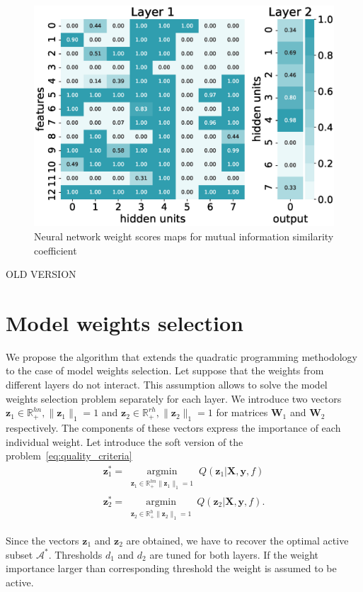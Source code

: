 \documentclass[a4paper,12pt]{article}
\theoremstyle{plain} %
\theoremstyle{definition} %
\theoremstyle{remark} %
\newcommand{\by}{\mathbf{y}}
\newcommand{\bz}{\mathbf{z}}
\newcommand{\cA}{\mathcal{A}}
\newcommand{\bbR}{\mathbb{R}}
\newcommand{\bW}{\mathbf{W}}
\newcommand{\bX}{\mathbf{X}}
\newcommand{\argmin}{\mathop{\arg \min}\limits}
\begin{document}
	\begin{figure}[!h]	
		\includegraphics[width=0.8\linewidth]{figs/qpfs_nn_weight_maps.eps}	 
	  	\caption{Neural network weight scores maps for mutual information similarity coefficient}
		\label{fig:qpfs_nn_weight_maps}
	\end{figure}
	
   \newpage
   \hrulefill
   
   OLD VERSION
  	\section*{Model weights selection}
  	
	We propose the algorithm that extends the quadratic programming methodology to the case of model weights selection.
	Let suppose that the weights from different layers do not interact. 
	This assumption allows to solve the model weights selection problem separately for each layer.
	We introduce two vectors $\bz_1 \in \bbR^{hn}_{+}, \|\bz_1\|_1 = 1$ and $\bz_2 \in \bbR^{rh}_{+}, \|\bz_2\|_1 = 1$ for matrices $\bW_1$ and $\bW_2$ respectively. 
	The components of these vectors express the importance of each individual weight.
	Let introduce the soft version of the problem~\ref{eq:quality_criteria}
	\begin{align}
		\bz_1^* = \argmin_{\substack{\bz_1 \in \bbR^{hn}_{+} \| \bz_1 \|_1 = 1}} Q(\bz_1 | \bX, \by, f) 
		\label{eq:soft_quality_criteria1}\\
		\bz_2^* = \argmin_{\substack{ \bz_2 \in \bbR^{h}_{+} \| \bz_2 \|_1 = 1}} Q(\bz_2 | \bX, \by, f) .
		\label{eq:soft_quality_criteria2}
	\end{align}

	Since the vectors $\bz_1$ and $\bz_2$ are obtained, we have to recover the optimal active subset $\cA^*$. 
	Thresholds $d_1$ and $d_2$ are tuned for both layers. If the weight importance larger than corresponding threshold the weight is assumed to be active.
	
\end{document}
